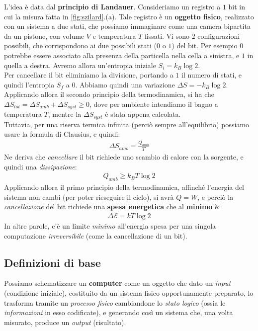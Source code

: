 \documentclass[../../InformazioneQuantistica.tex]{subfiles}
\begin{document}
L'idea è data dal \textbf{principio di Landauer}. Consideriamo un registro a $1$ bit in cui  la misura fatta in \ref{fig:szilard}.(a). Tale registro è un \textbf{oggetto fisico}, realizzato con un sistema a due stati, che possiamo immaginare come una camera bipartita da un pistone, con volume $V$ e temperatura $T$ fissati. Vi sono $2$ configurazioni possibili, che corrispondono ai due possibili stati ($0$ o $1$) del bit. Per esempio $0$ potrebbe essere associato alla presenza della particella nella cella a sinistra, e $1$ in quella a destra. Avremo allora un'entropia iniziale $S_i = k_B \log 2$.\\
Per cancellare il bit eliminiamo la divisione, portando a $1$ il numero di stati, e quindi l'entropia $S_f$ a $0$. Abbiamo quindi una variazione $\Delta S = -k_B \log 2$.\\
Applicando allora il secondo principio della termodinamica, si ha che $\Delta S_{tot} = \Delta S_{amb} + \Delta S_{syst} \geq 0$, dove per ambiente intendiamo il bagno a temperatura $T$, mentre la $\Delta S_{syst}$ è stata appena calcolata.\\
Tuttavia, per una riserva termica infinita (perciò sempre all'equilibrio) possiamo usare la formula di Clausius, e quindi:
\begin{align*}
\Delta S_{amb} =\frac{Q_{amb}}{T}
\end{align*}
Ne deriva che \textit{cancellare} il bit richiede uno scambio di calore con la sorgente, e quindi una \textit{dissipazione}:
\begin{align*}
Q_{amb} \geq k_B T \log 2
\end{align*}
Applicando allora il primo principio della termodinamica, affinché l'energia del sistema non cambi (per poter rieseguire il ciclo), si avrà $Q=W$, e perciò la \textit{cancellazione} del bit richiede una \textbf{spesa energetica} che al \textbf{minimo} è: 
\begin{align*}
\Delta \mathcal{E} = kT \log 2 
\end{align*}
In altre parole, c'è un limite \textit{minimo} all'energia spesa per una singola computazione \textit{irreversibile} (come la cancellazione di un bit).

\subsection{Definizioni di base}

Possiamo schematizzare un \textbf{computer} come un oggetto che dato un \textit{input} (condizione iniziale), costituito da un sistema fisico opportunamente preparato, lo trasforma tramite un \textit{processo fisico} cambiandone lo \textit{stato logico} (ossia le \textit{informazioni} in esso codificate), e generando così un sistema che, una volta misurato, produce un \textit{output} (risultato).\\
\end{document}
